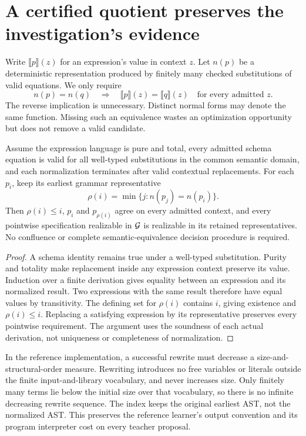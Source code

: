 \section{A certified quotient preserves the investigation's evidence}\label{SII:sec:ordered-quotient}
Write $\llbracket p\rrbracket(z)$ for an expression's value in context $z$. Let $n(p)$ be a deterministic representation produced by finitely many checked substitutions of valid equations. We only require
\[
 n(p)=n(q)\quad\Longrightarrow\quad
 \llbracket p\rrbracket(z)=\llbracket q\rrbracket(z)
 \quad\text{for every admitted }z.
\]
The reverse implication is unnecessary. Distinct normal forms may denote the same function. Missing such an equivalence wastes an optimization opportunity but does not remove a valid candidate.

\begin{SIItheorem}\label{SII:thm:certified-quotient}
Assume the expression language is pure and total, every admitted schema equation is valid for all well-typed substitutions in the common semantic domain, and each normalization terminates after valid contextual replacements. For each $p_i$, keep its earliest grammar representative
\[
 \rho(i)=\min\{j:n(p_j)=n(p_i)\}.
\]
Then $\rho(i)\le i$, $p_i$ and $p_{\rho(i)}$ agree on every admitted context, and every pointwise specification realizable in $\mathcal G$ is realizable in its retained representatives. No confluence or complete semantic-equivalence decision procedure is required.
\end{SIItheorem}
\begin{proof}
A schema identity remains true under a well-typed substitution. Purity and totality make replacement inside any expression context preserve its value. Induction over a finite derivation gives equality between an expression and its normalized result. Two expressions with the same result therefore have equal values by transitivity. The defining set for $\rho(i)$ contains $i$, giving existence and $\rho(i)\le i$. Replacing a satisfying expression by its representative preserves every pointwise requirement. The argument uses the soundness of each actual derivation, not uniqueness or completeness of normalization.
\end{proof}

In the reference implementation, a successful rewrite must decrease a size-and-structural-order measure. Rewriting introduces no free variables or literals outside the finite input-and-library vocabulary, and never increases size. Only finitely many terms lie below the initial size over that vocabulary, so there is no infinite decreasing rewrite sequence. The index keeps the original earliest AST, not the normalized AST. This preserves the reference learner's output convention and its program interpreter cost on every teacher proposal.

